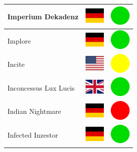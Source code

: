 \documentclass[12pt, a4paper, twoside]{report}
\begin{document}
\begin{center}
\begin{longtable}{|p{5cm}|p{2cm}|p{2cm}|}
Imperium Dekadenz & \includegraphics[width=1cm]{4x3/de} & \includegraphics[width=1cm]{likes/y} \\ \hline
Implore & \includegraphics[width=1cm]{4x3/de} & \includegraphics[width=1cm]{likes/y} \\ \hline
Incite & \includegraphics[width=1cm]{4x3/us} & \includegraphics[width=1cm]{likes/m} \\ \hline
Inconcessus Lux Lucis & \includegraphics[width=1cm]{4x3/gb} & \includegraphics[width=1cm]{likes/y} \\ \hline
Indian Nightmare & \includegraphics[width=1cm]{4x3/de} & \includegraphics[width=1cm]{likes/n} \\ \hline
Infected Inzestor & \includegraphics[width=1cm]{4x3/de} & \includegraphics[width=1cm]{likes/y} \\ \hline

\end{longtable}
\end{center}
\end{document}
